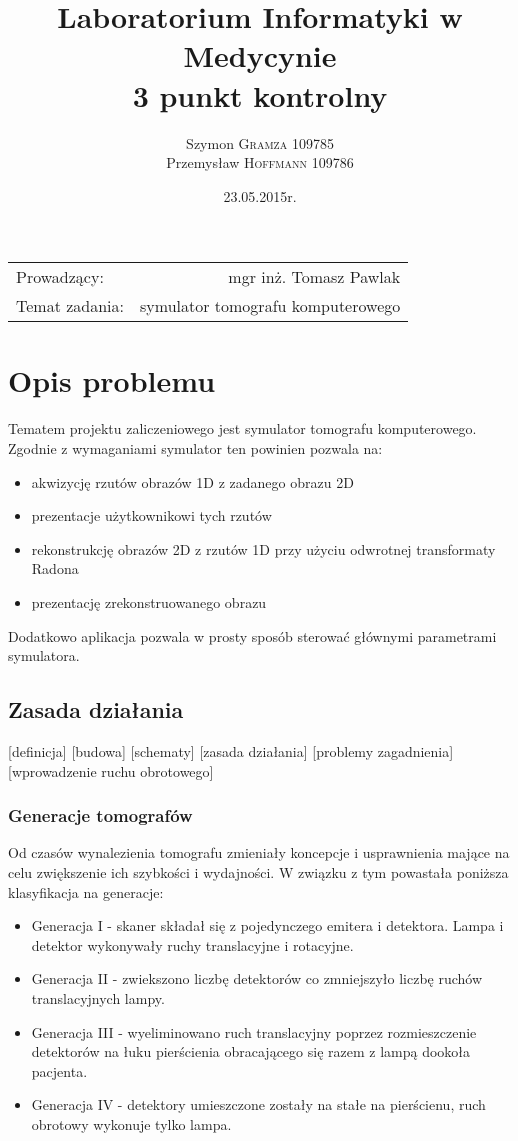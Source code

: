 \documentclass[A_4paper,12pt]{article}
\title{Laboratorium Informatyki w Medycynie \\ 3 punkt kontrolny} %
\author{Szymon \textsc{Gramza} 109785  \\ Przemysław \textsc{Hoffmann} 109786} %
\date{23.05.2015r.} %
\begin{document}
\maketitle %

\begin{center}
\begin{tabular}{l r}
Prowadzący: & mgr inż. Tomasz Pawlak \\
Temat zadania: & symulator tomografu komputerowego
\end{tabular}
\end{center}

\newpage

\section{Opis problemu}
Tematem projektu zaliczeniowego jest symulator tomografu komputerowego.
Zgodnie z wymaganiami symulator ten powinien pozwala na:
\begin{itemize}
\item akwizycję rzutów obrazów 1D z zadanego obrazu 2D
\item prezentacje użytkownikowi tych rzutów
\item rekonstrukcję obrazów 2D z rzutów 1D przy użyciu odwrotnej transformaty Radona
\item prezentację zrekonstruowanego obrazu
\end{itemize}
Dodatkowo aplikacja pozwala w prosty sposób sterować głównymi parametrami symulatora.

\subsection{Zasada działania}
[definicja]
[budowa]
[schematy]
[zasada działania]
[problemy zagadnienia]
[wprowadzenie ruchu obrotowego]

\subsubsection{Generacje tomografów}
Od czasów wynalezienia tomografu zmieniały koncepcje i usprawnienia mające na celu zwiększenie ich szybkości i wydajności.
W związku z tym powastała poniższa klasyfikacja na generacje:
\begin{itemize}
\item Generacja I - skaner składał się z pojedynczego emitera i detektora. Lampa i detektor wykonywały ruchy translacyjne i rotacyjne.
\item Generacja II - zwiekszono liczbę detektorów co zmniejszyło liczbę ruchów translacyjnych lampy.
\item Generacja III - wyeliminowano ruch translacyjny poprzez rozmieszczenie detektorów na łuku pierścienia obracającego się razem z lampą dookoła pacjenta.
\item Generacja IV - detektory umieszczone zostały na stałe na pierścienu, ruch obrotowy wykonuje tylko lampa.
\end{itemize}
\end{document}
